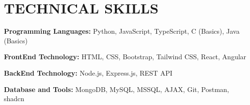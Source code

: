 \documentclass[letterpaper,11pt]{article}
\begin{document}
\noindent
\begin{minipage}[t]{0.48\textwidth}
    \section{\color{airforceblue}TECHNICAL SKILLS}
    \begin{itemize}[leftmargin=0in, label={}]
        \small{\item{
            \textbf{\normalsize{Programming Languages:}}{ \normalsize{Python, JavaScript, TypeScript, C (Basics), Java (Basics)}} \\
            \vspace{-12pt}
      
            \textbf{\normalsize{FrontEnd Technology:}}{ \normalsize{HTML, CSS, Bootstrap, Tailwind CSS,  React, Angular}} \\
            \vspace{-12pt}
      
            \textbf{\normalsize{BackEnd Technology:}}{ \normalsize{Node.js, Express.js, REST API}} \\
            \vspace{-12pt}
      
            \textbf{\normalsize{Database and Tools:}}{ \normalsize{MongoDB, MySQL, MSSQL, AJAX, Git, Postman, shadcn}}
        }}
    \end{itemize}
\end{minipage}
\hfill
\vrule{} %
\hfill
\end{document}
